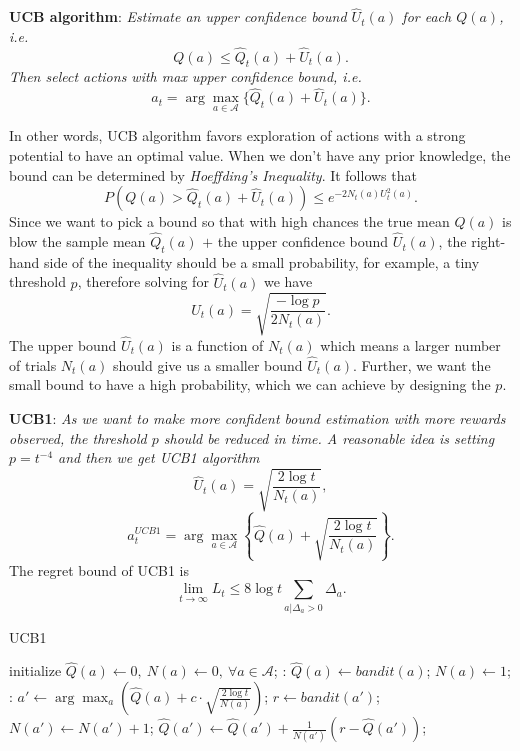 \documentclass{progartcn}
\begin{document}
        	\textbf{UCB algorithm}: \textit{Estimate an upper confidence bound $\hat{U}_t(a)$ for each $Q(a)$, i.e.}
        	\[Q(a)\le \hat{Q}_t(a)+\hat{U}_t(a).\]
        	\textit{Then select actions with max upper confidence bound, i.e.}
        	\[a_t=\arg\max_{a\in \mathcal{A}}\{\hat{Q}_t(a)+\hat{U}_t(a)\}.\]

        	In other words, UCB algorithm favors exploration of actions with a strong potential to have an optimal value. When we don't have any prior knowledge, the bound can be determined by \textit{Hoeffding's Inequality}. It follows that
        	\[P(Q(a)> \hat{Q}_t(a)+\hat{U}_t(a))\le e^{-2N_t(a)U_t^2(a)}.\]
        	Since we want to pick a bound so that with high chances the true mean $Q(a)$ is blow the sample mean $\hat{Q}_t(a)$ $+$ the upper confidence bound $\hat{U}_t(a)$, the right-hand side of the inequality should be a small probability, for example, a tiny threshold $p$, therefore solving for $\hat{U}_t(a)$ we have
        	\[\hat{U}_t(a)=\sqrt{\frac{-\log p}{2N_t(a)}}.\]
        	The upper bound $\hat{U}_t(a)$ is a function of $N_t(a)$ which means a larger number of trials $N_t(a)$ should give us a smaller bound $\hat{U}_t(a)$. Further, we want the small bound to have a high probability, which we can achieve by designing the $p$.

        	\textbf{UCB1}: \textit{As we want to make more confident bound estimation with more rewards observed, the threshold $p$ should be reduced in time. A reasonable idea is setting $p=t^{-4}$ and then we get UCB1 algorithm}
        	\[\hat{U}_t(a)=\sqrt{\frac{2\log t}{N_t(a)}},\]
        	\[a_t^{UCB1}=\arg\max_{a\in \mathcal{A}}\left\{\hat{Q}(a)+\sqrt{\frac{2\log t}{N_t(a)}}\right\}.\]
        	The regret bound of UCB1 is
        	\[\lim_{t\to\infty}L_t\le 8\log t\sum_{a|\Delta_a>0} \Delta_a.\]

        	\begin{algorithm}[H]
			\caption{UCB1}
			\label{alg: ucb}
			\begin{algorithmic}[1]
				\State initialize $\hat{Q}(a)\gets 0,\ N(a)\gets0,\ \forall a\in\mathcal{A}$;
				:
					\State $\hat{Q}(a)\gets bandit(a)$;
					\State $N(a)\gets 1$;
				\EndFor
				:
					\State $a'\gets\arg\max_{a} \left(\hat{Q}(a)+c\cdot\sqrt{\frac{2\log t}{N(a)}}\right)$;
					\State $r\gets bandit(a')$;
					\State $N(a')\gets N(a')+1$;
					\State $\hat{Q}(a')\gets \hat{Q}(a')+\frac{1}{N(a')}(r-\hat{Q}(a'))$;
            	\EndFor
			\end{algorithmic}
			\end{algorithm}
\end{document}
